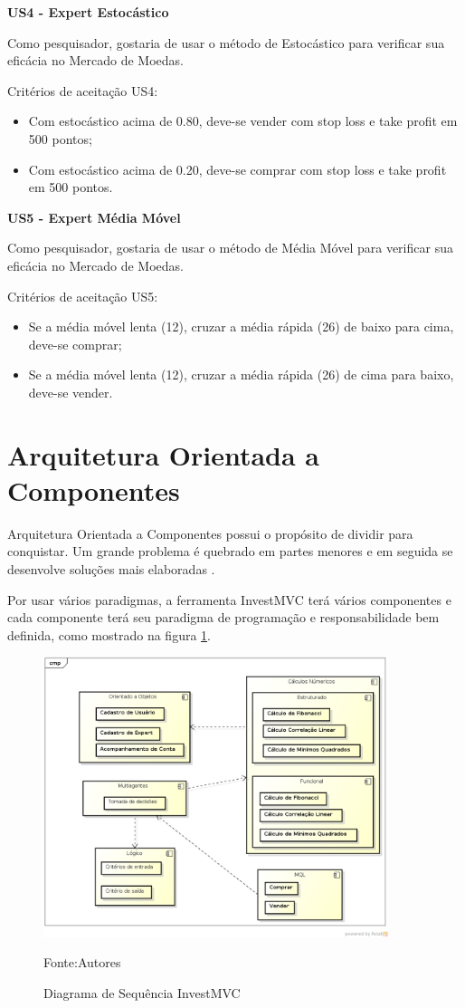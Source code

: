 \textbf{US4 - Expert Estocástico}

Como pesquisador, gostaria de usar o método de Estocástico para verificar sua eficácia no Mercado de Moedas.

Critérios de aceitação US4:
\begin{itemize}
\item Com estocástico acima de 0.80, deve-se vender com stop loss e take profit em 500 pontos;
\item Com estocástico acima de 0.20, deve-se comprar com stop loss e take profit em 500 pontos.
\end{itemize}

\textbf{US5 - Expert Média Móvel}

Como pesquisador, gostaria de usar o método de Média Móvel para verificar sua eficácia no Mercado de Moedas.

Critérios de aceitação US5:
\begin{itemize}
\item Se a média móvel lenta (12), cruzar a média rápida (26) de baixo para cima, deve-se comprar;
\item Se a média móvel lenta (12), cruzar a média rápida (26) de cima para baixo, deve-se vender.
\end{itemize}

\section{Arquitetura Orientada a Componentes}

Arquitetura Orientada a Componentes possui o propósito de dividir para conquistar. Um grande problema é quebrado em partes menores e em seguida se desenvolve soluções mais elaboradas \cite{john}.

Por usar vários paradigmas, a ferramenta InvestMVC terá vários componentes e cada componente terá seu paradigma de programação e responsabilidade bem definida, como mostrado na figura \ref{componente}.

\begin{figure}[htp]
\centering
\includegraphics[width=0.9\textwidth]{figuras/componente}
\caption{Diagrama de Sequência InvestMVC}{Fonte:Autores}
\label{componente}
\end{figure}

